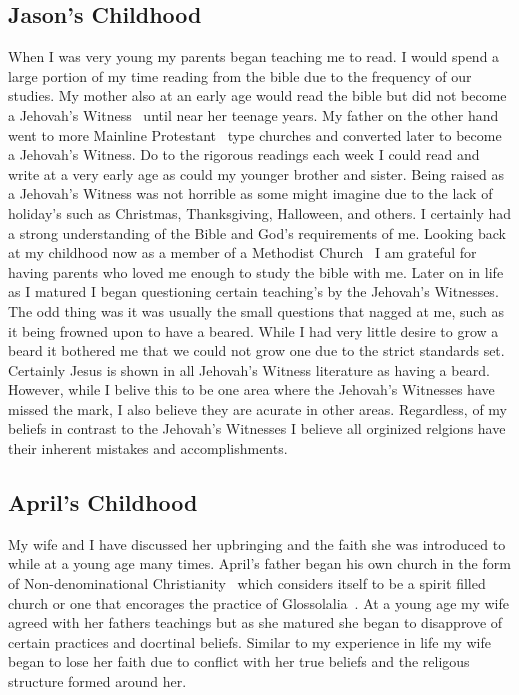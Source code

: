 \documentclass[11pt,a4paper]{scrartcl} %
\begin{document}
\begin{doublespace}
\subsection{Jason's Childhood}
When I was very young my parents began teaching me to read. I would spend a large portion of my time reading from the bible due to the frequency of our studies. My mother also at an early age would read the bible but did not become a Jehovah's Witness~\cite{wiki:001} until near her teenage years. My father on the other hand went to more Mainline Protestant~\cite{wiki:003} type churches and converted later to become a Jehovah's Witness. Do to the rigorous readings each week I could read and write at a very early age as could my younger brother and sister. Being raised as a Jehovah's Witness was not horrible as some might imagine due to the lack of holiday's such as Christmas, Thanksgiving, Halloween, and others. I certainly had a strong understanding of the Bible and God's requirements of me. Looking back at my childhood now as a member of a Methodist Church~\cite{wiki:002} I am grateful for having parents who loved me enough to study the bible with me. Later on in life as I matured I began questioning certain teaching's by the Jehovah's Witnesses. The odd thing was it was usually the small questions that nagged at me, such as it being frowned upon to have a beared. While I had very little desire to grow a beard it bothered me that we could not grow one due to the strict standards set. Certainly Jesus is shown in all Jehovah's Witness literature as having a beard. However, while I belive this to be one area where the Jehovah's Witnesses have missed the mark, I also believe they are acurate in other areas. Regardless, of my beliefs in contrast to the Jehovah's Witnesses I believe all orginized relgions have their inherent mistakes and accomplishments. 
\subsection{April's Childhood}
My wife and I have discussed her upbringing and the faith she was introduced to while at a young age many times. April's father began his own church in the form of Non-denominational Christianity~\cite{wiki:004} which considers itself to be a spirit filled church or one that encorages the practice of Glossolalia~\cite{wiki:005}. At a young age my wife agreed with her fathers teachings but as she matured she began to disapprove of certain practices and docrtinal beliefs. Similar to my experience in life my wife began to lose her faith due to conflict with her true beliefs and the religous structure formed around her. 
\end{doublespace}
\end{document}
